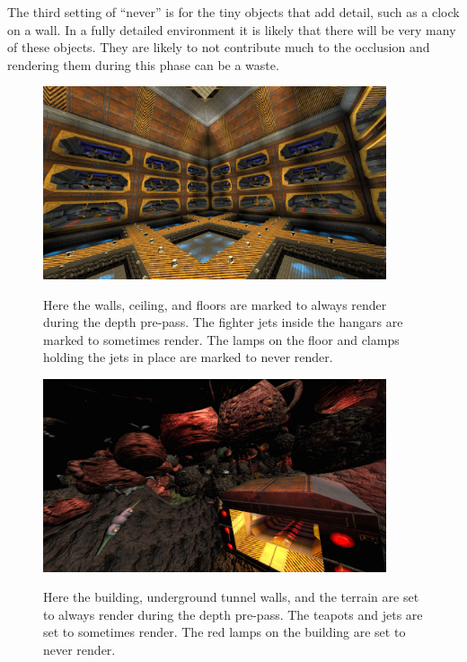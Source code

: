 \documentclass[12pt]{ucthesis}
\newcommand{\captionfonts}{\small\bf\ssp}
\begin{document}
The third setting of ``never'' is for the tiny objects that add detail, such as a clock on a wall.
In a fully detailed environment it is likely that there will be very many of these objects.
They are likely to not contribute much to the occlusion and rendering them during this phase can be a waste.

\begin{figure}
\begin{center}
\includegraphics[width=0.9\textwidth]{Images/HangarCorner.jpg}
\captionfonts
\caption[Hangar Corner]{Here the walls, ceiling, and floors are marked to always render during the depth pre-pass.  The fighter jets inside the hangars are marked to sometimes render.  The lamps on the floor and clamps holding the jets in place are marked to never render.}
\label{fig:hangar-corner}
\end{center}
\end{figure}

\begin{figure}
\begin{center}
\includegraphics[width=0.9\textwidth]{Images/HangarEntrance.jpg}
\captionfonts
\caption[Hangar Entrance]{Here the building, underground tunnel walls, and the terrain are set to always render during the depth pre-pass.  The teapots and jets are set to sometimes render.  The red lamps on the building are set to never render.}
\label{fig:hangar-entrance_}
\end{center}
\end{figure}
\end{document}
